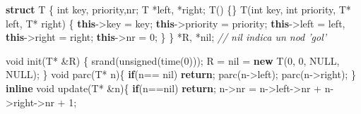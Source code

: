 \documentclass[10pt,]{article}
\newenvironment{Shaded}{}{}
\newcommand{\KeywordTok}[1]{\textcolor[rgb]{0.00,0.44,0.13}{\textbf{{#1}}}}
\newcommand{\DataTypeTok}[1]{\textcolor[rgb]{0.56,0.13,0.00}{{#1}}}
\newcommand{\DecValTok}[1]{\textcolor[rgb]{0.25,0.63,0.44}{{#1}}}
\newcommand{\CommentTok}[1]{\textcolor[rgb]{0.38,0.63,0.69}{\textit{{#1}}}}
\newcommand{\NormalTok}[1]{{#1}}
\begin{document}
\begin{Shaded}
\begin{Highlighting}[]
\KeywordTok{struct} \NormalTok{T \{}
  \DataTypeTok{int} \NormalTok{key, priority,nr;}
  \NormalTok{T *left, *right;}
  \NormalTok{T() \{\}}
  \NormalTok{T(}\DataTypeTok{int} \NormalTok{key, }\DataTypeTok{int} \NormalTok{priority, T* left, T* right) \{}
    \KeywordTok{this}\NormalTok{->key = key;}
    \KeywordTok{this}\NormalTok{->priority = priority;}
    \KeywordTok{this}\NormalTok{->left = left, }\KeywordTok{this}\NormalTok{->right = right;}
    \KeywordTok{this}\NormalTok{->nr = }\DecValTok{0}\NormalTok{;}
  \NormalTok{\}}
\NormalTok{\} *R, *nil; }\CommentTok{// nil indica un nod 'gol'}

\DataTypeTok{void} \NormalTok{init(T* &R) \{}
  \NormalTok{srand(}\DataTypeTok{unsigned}\NormalTok{(time(}\DecValTok{0}\NormalTok{)));}
  \NormalTok{R = nil = }\KeywordTok{new} \NormalTok{T(}\DecValTok{0}\NormalTok{, }\DecValTok{0}\NormalTok{, NULL, NULL);}
\NormalTok{\}}
\DataTypeTok{void} \NormalTok{parc(T* n)\{}
  \KeywordTok{if}\NormalTok{(n== nil)}
    \KeywordTok{return}\NormalTok{;}
  \NormalTok{parc(n->left);}
  \NormalTok{parc(n->right);}
\NormalTok{\}}
\KeywordTok{inline} \DataTypeTok{void} \NormalTok{update(T* &n)\{}
  \KeywordTok{if}\NormalTok{(n==nil)}
    \KeywordTok{return}\NormalTok{;}
  \NormalTok{n->nr = n->left->nr + n->right->nr + }\DecValTok{1}\NormalTok{;}


\end{Highlighting}
\end{Shaded}
\end{document}
